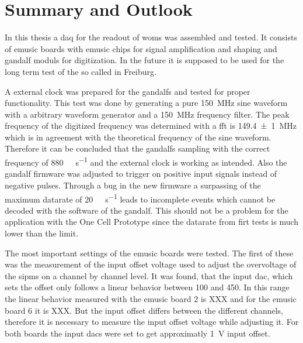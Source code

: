 \chapter{Summary and Outlook}
In this thesis a \ac{daq} for the readout of \acp{wom} was assembled and tested.
It consists of \ac{emusic} boards with \ac{emusic} chips for signal amplification and shaping and \ac{gandalf} moduls for digitization.
In the future it is supposed to be used for the long term test of the so called  in Freiburg.

A external clock was prepared for the \acp{gandalf} and tested for proper functionality.
This test was done by generating a pure \SI{150}{\mega\hertz} sine waveform with a arbitrary waveform generator and a \SI{150}{\mega\hertz} frequency filter.
The peak frequency of the digitized frequency was determined with a \ac{fft} is \SI{149.4(10)}{\mega\hertz} which is in agreement with the theoretical frequency of the sine waveform.
Therefore it can be concluded that the \acp{gandalf} sampling with the correct frequency of \SI{880}{\mega\sample\per\second} and the external clock is working as intended.
Also the \ac{gandalf} firmware was adjusted to trigger on positive input signals instead of negative pulses.
Through a bug in the new firmware a surpassing of the maximum datarate of \SI{20}{\mega\byte\per\second} leads to incomplete events which cannot be decoded with the software of the \ac{gandalf}.
This should not be a problem for the application with the One Cell Prototype since the datarate from firt tests is much lower than the limit.

The most important settings of the \ac{emusic} boards were tested.
The first of these was the measurement of the input offset voltage used to adjust the overvoltage of the \acp{sipm} on a channel by channel level.
It was found, that the input \ac{dac}, which sets the offset only follows a linear behavior between \SI{100}{\dacu} and \SI{450}{\dacu}.
In this range the linear behavior measured with the \ac{emusic} board 2 is XXX and for the \ac{emusic} board 6 it is XXX.
But the input offset differs between the different channels, therefore it is necessary to measure the input offset voltage while adjusting it.
For both boards the input \acp{dac} were set to get approximatly \SI{1}{\volt} input offset.


